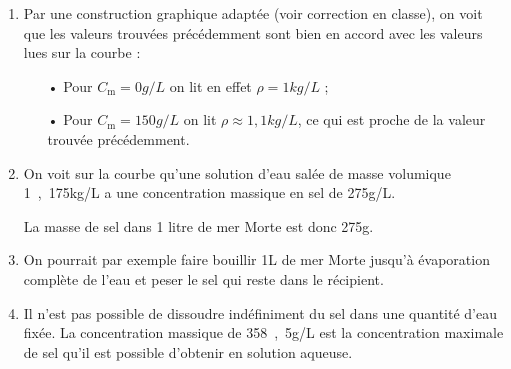 \begin{enumerate}[resume]
\item Par une construction graphique adaptée (voir correction en classe), on voit que les valeurs trouvées précédemment sont bien en accord avec les valeurs lues sur la courbe :
\begin{itemize}
\item[•] Pour $C_\mathrm{m} = \unit{0}{g/L}$ on lit en effet $\rho = \unit{1}{kg/L}$ ;
\item[•] Pour $C_\mathrm{m} = \unit{150}{g/L}$ on lit $\rho \approx \unit{1{,}1}{kg/L}$, ce qui est proche de la valeur trouvée précédemment.
\end{itemize} 

\item On voit sur la courbe qu'une solution d'eau salée de masse volumique \unit{1{,}175}{kg/L} a une concentration massique en sel de \unit{275}{g/L}.

La masse de sel dans 1 litre de mer Morte est donc \unit{275}{g}.

\item On pourrait par exemple faire bouillir \unit{1}{L} de mer Morte jusqu'à évaporation complète de l'eau et peser le sel qui reste dans le récipient.

\item Il n'est pas possible de dissoudre indéfiniment du sel dans une quantité d'eau fixée.
La concentration massique de \unit{358{,}5}{g/L} est la concentration maximale de sel qu'il est possible d'obtenir en solution aqueuse.
\end{enumerate}

